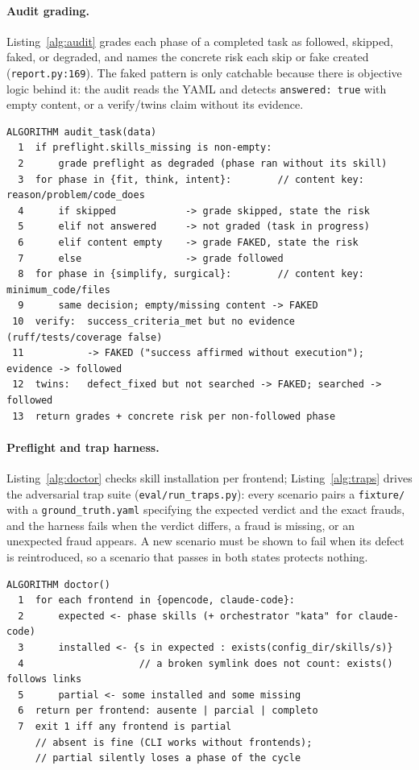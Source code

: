 \documentclass[11pt]{article}
\begin{document}
\paragraph{Audit grading.} Listing~\ref{alg:audit} grades each phase of a
completed task as followed, skipped, faked, or degraded, and names the
concrete risk each skip or fake created (\texttt{report.py:169}). The faked
pattern is only catchable because there is objective logic behind it: the
audit reads the YAML and detects \texttt{answered: true} with empty
content, or a verify/twins claim without its evidence.

\begin{lstlisting}[caption=audit grading (kata/report.py).,label=alg:audit]
ALGORITHM audit_task(data)
  1  if preflight.skills_missing is non-empty:
  2      grade preflight as degraded (phase ran without its skill)
  3  for phase in {fit, think, intent}:        // content key: reason/problem/code_does
  4      if skipped            -> grade skipped, state the risk
  5      elif not answered     -> not graded (task in progress)
  6      elif content empty    -> grade FAKED, state the risk
  7      else                  -> grade followed
  8  for phase in {simplify, surgical}:        // content key: minimum_code/files
  9      same decision; empty/missing content -> FAKED
 10  verify:  success_criteria_met but no evidence (ruff/tests/coverage false)
 11           -> FAKED ("success affirmed without execution"); evidence -> followed
 12  twins:   defect_fixed but not searched -> FAKED; searched -> followed
 13  return grades + concrete risk per non-followed phase
\end{lstlisting}

\paragraph{Preflight and trap harness.} Listing~\ref{alg:doctor} checks
skill installation per frontend; Listing~\ref{alg:traps} drives the
adversarial trap suite (\texttt{eval/run\_traps.py}): every scenario pairs
a \texttt{fixture/} with a \texttt{ground\_truth.yaml} specifying the
expected verdict and the exact frauds, and the harness fails when the
verdict differs, a fraud is missing, or an unexpected fraud appears. A new
scenario must be shown to fail when its defect is reintroduced, so a
scenario that passes in both states protects nothing.

\begin{lstlisting}[caption=preflight doctor (kata/skills.py).,label=alg:doctor]
ALGORITHM doctor()
  1  for each frontend in {opencode, claude-code}:
  2      expected <- phase skills (+ orchestrator "kata" for claude-code)
  3      installed <- {s in expected : exists(config_dir/skills/s)}
  4                    // a broken symlink does not count: exists() follows links
  5      partial <- some installed and some missing
  6  return per frontend: ausente | parcial | completo
  7  exit 1 iff any frontend is partial
     // absent is fine (CLI works without frontends);
     // partial silently loses a phase of the cycle
\end{lstlisting}
\end{document}
